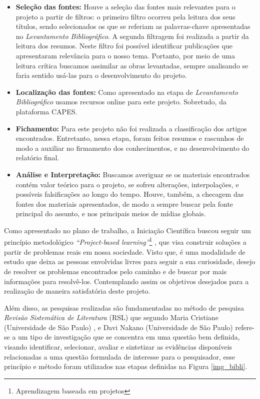 \begin{itemize}
\item \textbf{Seleção das fontes:} Houve a seleção das fontes mais relevantes para o projeto a partir de filtros: o primeiro filtro ocorreu pela leitura dos seus títulos, sendo selecionados os que se referiam as palavras-chave apresentadas no \textit{Levantamento Bibliográfico}. A segunda filtragem foi realizada a partir da leitura dos resumos. Neste filtro foi possível identificar publicações que apresentaram relevância para o nosso tema.
Portanto, por meio de uma leitura crítica buscamos assimilar as obras levantadas, sempre analisando se faria sentido usá-las para o desenvolvimento do projeto. 

\item \textbf{Localização das fontes:} Como apresentado na etapa de \textit{Levantamento Bibliográfico} usamos recursos online para este projeto. Sobretudo, da plataforma CAPES.

\item \textbf{Fichamento:} Para este projeto não foi realizada a classificação dos artigos encontrados. Entretanto, nessa etapa, foram feitos resumos e rascunhos de modo a auxiliar no firmamento dos conhecimentos, e no desenvolvimento do relatório final.

\item \textbf{Análise e Interpretação:} Buscamos averiguar se os materiais encontrados contém valor teórico para o projeto, se sofreu alterações, interpolações, e possíveis falsificações ao longo do tempo. Houve, também, a checagem das fontes dos materiais apresentados, de modo a sempre buscar pela fonte principal do assunto, e nos principais meios de mídias globais.
\end{itemize}

Como apresentado no plano de trabalho, a Iniciação Científica buscou seguir um princípio metodológico \textit{“Project-based learning”}\footnote{Aprendizagem baseada em projetos} \cite{krajcik2006project}, que visa construir soluções a partir de problemas reais em nossa sociedade. Visto que, é uma modalidade de estudo que deixa as pessoas envolvidas livres para seguir a sua curiosidade, desejo de resolver os problemas encontrados pelo caminho e de buscar por mais informações para resolvê-los. Contemplando assim os objetivos desejados para a realização de maneira satisfatória deste projeto. 

Além disso, as pesquisas realizadas são fundamentadas no método de pesquisa \textit{Revisão Sistemática de Literatura} (RSL) que segundo Maria Cristiane (Universidade de São Paulo) \cite{revi3}, e Davi Nakano (Universidade de São Paulo) \cite{revi2} refere-se a um tipo de investigação que se concentra em uma questão bem definida, visando identificar, selecionar, avaliar e sintetizar as evidências disponíveis relacionadas a uma questão formulada de interesse para o pesquisador, esse princípio e método foram utilizados nas etapas definidas na Figura \ref{img_bibli}.

